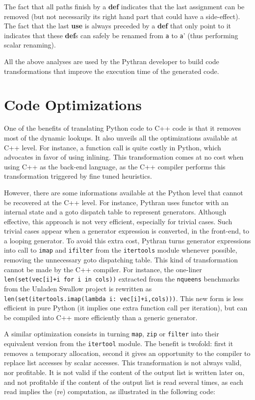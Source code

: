 \documentclass[10pt, onecolumn, preprint]{sigplanconf}
\begin{document}
The fact that all paths finish by a \textbf{def} indicates that the last
assignment can be removed (but not necessarily its right hand part that could
have a side-effect). The fact that the last \textbf{use} is always preceded by
a \textbf{def} that only point to it indicates that these \textbf{def}s can
safely be renamed from \texttt{a} to \texttt{a}' (thus performing scalar
renaming).

All the above analyses are used by the Pythran developer to build code
transformations that improve the execution time of the generated code.

\section{Code Optimizations}
\label{sec:optimizations}

One of the benefits of translating Python code to C++ code is that it removes
most of the dynamic lookups. It also unveils all the optimizations available at
C++ level. For instance, a function call is quite costly in Python, which
advocates in favor of using inlining. This transformation comes at no cost when
using C++ as the back-end language, as the C++ compiler performs this 
transformation triggered by fine tuned heuristics.

However, there are some informations available at the Python level that cannot
be recovered at the C++ level. For instance, Pythran uses functor with an
internal state and a goto dispatch table to represent generators. Although
effective, this approach is not very efficient, especially for trivial cases.
Such trivial cases appear when a generator expression is converted, in the
front-end, to a looping generator. To avoid this extra cost, Pythran turns
generator expressions into call to \texttt{imap} and \texttt{ifilter} from the
\texttt{itertools} module whenever possible, removing the unnecessary goto
dispatching table. This kind of transformation cannot be made by the C++
compiler. For instance, the one-liner \texttt{len(set(vec[i]+i for i in cols))}
extracted from the \texttt{nqueens} benchmarks from the Unladen Swallow project
is rewritten as \texttt{len(set(itertools.imap(lambda i: vec[i]+i,cols)))}.
This new form is less efficient in pure Python (it implies one extra function
call per iteration), but can be compiled into C++ more efficiently than a
generic generator.

A similar optimization consists in turning \texttt{map}, \texttt{zip} or
\texttt{filter} into their equivalent version from the \texttt{itertool}
module. The benefit is twofold: first it removes a temporary allocation, second
it gives an opportunity to the compiler to replace list accesses by scalar
accesses. This transformation is not always valid, nor profitable. It is not
valid if the content of the output list is written later on, and not profitable
if the content of the output list is read several times, as each read implies
the (re) computation, as illustrated in the following code:
\end{document}
